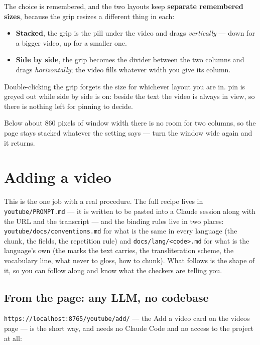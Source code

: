 \documentclass[11pt,oneside]{report}
\newcommand{\file}[1]{\texttt{#1}}
\newcommand{\menu}[1]{\textsf{#1}}
\begin{document}
The choice is remembered, and the two layouts keep \textbf{separate
remembered sizes}, because the grip resizes a different thing in each:

\begin{itemize}
\item \textbf{Stacked}, the grip is the pill under the video and drags
  \emph{vertically} --- down for a bigger video, up for a smaller one.
\item \textbf{Side by side}, the grip becomes the divider between the two
  columns and drags \emph{horizontally}; the video fills whatever width you
  give its column.
\end{itemize}

Double-clicking the grip forgets the size for whichever layout you are in.
\menu{pin} is greyed out while side by side is on: beside the text the
video is always in view, so there is nothing left for pinning to decide.

Below about 860 pixels of window width there is no room for two columns, so
the page stays stacked whatever the setting says --- turn the window wide
again and it returns.

\chapter{Adding a video}
\label{ch:addvideo}

This is the one job with a real procedure. The full recipe lives in
\file{youtube/PROMPT.md} --- it is written to be pasted into a Claude session
along with the URL and the transcript --- and the binding rules live in two
places: \file{youtube/docs/conventions.md} for what is the same in every
language (the chunk, the fields, the repetition rule) and
\file{docs/lang/<code>.md} for what is the language's own (the marks the
text carries, the transliteration scheme, the vocabulary line, what never to
gloss, how to chunk). What follows is the shape of it, so you can follow
along and know what the checkers are telling you.

\section{From the page: any LLM, no codebase}

\texttt{https://localhost:8765/youtube/add/} --- the \menu{Add a video}
card on the videos page --- is the short way, and needs no Claude Code and
no access to the project at all:
\end{document}
